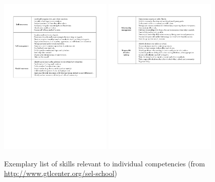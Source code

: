 \documentclass[prodmode,acmtochi]{acmsmall}
\begin{document}
\begin{figure}
  \centering
	\includegraphics[width=0.48\textwidth]{images/skills-list1}
	\includegraphics[width=0.48\textwidth]{images/skills-list2}
	\caption{Exemplary list of skills relevant to individual competencies (from \url{http://www.gtlcenter.org/sel-school})}
	\label{fig:skillsList}
\end{figure}
\end{document}
